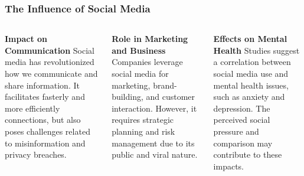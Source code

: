 \documentclass[5pt]{beamer}
\begin{document}
\begin{frame}
\frametitle{The Influence of Social Media}
\begin{columns}
\begin{column}{0.3\textwidth}
\begin{block}{\textbf{Impact on Communication}}
Social media has revolutionized how we communicate and share information. It facilitates fasterly and more efficiently connections, but also poses challenges related to misinformation and privacy breaches.
\end{block}
\end{column}
\begin{column}{0.3\textwidth}
\begin{block}{\textbf{Role in Marketing and Business}}
Companies leverage social media for marketing, brand-building, and customer interaction. However, it requires strategic planning and risk management due to its public and viral nature.
\end{block}
\end{column}
\begin{column}{0.3\textwidth}
\begin{block}{\textbf{Effects on Mental Health}}
Studies suggest a correlation between social media use and mental health issues, such as anxiety and depression. The perceived social pressure and comparison may contribute to these impacts.
\end{block}
\end{column}
\end{columns}
\end{frame}
\end{document}
